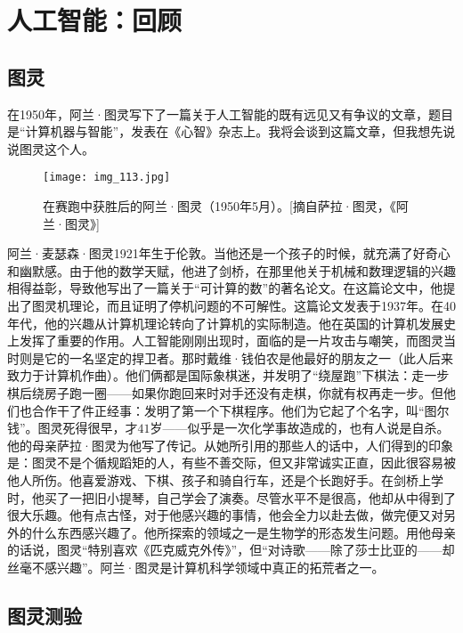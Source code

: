 
\chapter{人工智能：回顾}

\section{图灵}

在1950年，阿兰·图灵写下了一篇关于人工智能的既有远见又有争议的文章，题目是“计算机器与智能”，发表在《心智》杂志上。我将会谈到这篇文章，但我想先说说图灵这个人。

\begin{figure}
\texttt{[image: img\_113.jpg]}
\caption[阿兰·图灵。]
  {在赛跑中获胜后的阿兰·图灵（1950年5月）。[摘自萨拉·图灵，《阿兰·图灵》] }
\end{figure}

阿兰·麦瑟森·图灵1921年生于伦敦。当他还是一个孩子的时候，就充满了好奇心和幽默感。由于他的数学天赋，他进了剑桥，在那里他关于机械和数理逻辑的兴趣相得益彰，导致他写出了一篇关于“可计算的数”的著名论文。在这篇论文中，他提出了图灵机理论，而且证明了停机问题的不可解性。这篇论文发表于1937年。在40年代，他的兴趣从计算机理论转向了计算机的实际制造。他在英国的计算机发展史上发挥了重要的作用。人工智能刚刚出现时，面临的是一片攻击与嘲笑，而图灵当时则是它的一名坚定的捍卫者。那时戴维·钱伯农是他最好的朋友之一（此人后来致力于计算机作曲）。他们俩都是国际象棋迷，并发明了“绕屋跑”下棋法：走一步棋后绕房子跑一圈——如果你跑回来时对手还没有走棋，你就有权再走一步。但他们也合作干了件正经事：发明了第一个下棋程序。他们为它起了个名字，叫“图尔钱”。图灵死得很早，才$41$岁——似乎是一次化学事故造成的，也有人说是自杀。他的母亲萨拉·图灵为他写了传记。从她所引用的那些人的话中，人们得到的印象是：图灵不是个循规蹈矩的人，有些不善交际，但又非常诚实正直，因此很容易被他人所伤。他喜爱游戏、下棋、孩子和骑自行车，还是个长跑好手。在剑桥上学时，他买了一把旧小提琴，自己学会了演奏。尽管水平不是很高，他却从中得到了很大乐趣。他有点古怪，对于他感兴趣的事情，他会全力以赴去做，做完便又对另外的什么东西感兴趣了。他所探索的领域之一是生物学的形态发生问题。用他母亲的话说，图灵“特别喜欢《匹克威克外传》”，但“对诗歌——除了莎士比亚的——却丝毫不感兴趣”。阿兰·图灵是计算机科学领域中真正的拓荒者之一。

\section{图灵测验}

